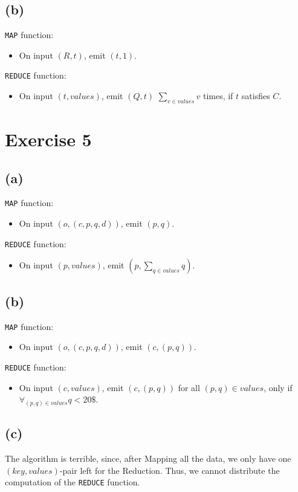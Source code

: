\documentclass[12pt]{article}
\begin{document}
\subsection*{(b)}
\verb|MAP| function:
\begin{itemize}
	\item	On input $(R, t)$, emit $(t,1)$.
\end{itemize}
\verb|REDUCE| function:
\begin{itemize}
	\item	On input $(t, values)$, emit $(Q,t)$ $\sum_{v \in values} v$ times, if $t$ satisfies $C$.
\end{itemize}

\section*{Exercise 5}
\subsection*{(a)}
\verb|MAP| function:
\begin{itemize}
	\item	On input $(o, (c,p,q,d))$, emit $(p,q)$.
\end{itemize}
\verb|REDUCE| function:
\begin{itemize}
	\item	On input $(p, values)$, emit $(p,\sum_{q \in values} q)$.
\end{itemize}

\subsection*{(b)}
\verb|MAP| function:
\begin{itemize}
	\item	On input $(o, (c,p,q,d))$, emit $(c,(p,q))$.
\end{itemize}
\verb|REDUCE| function:
\begin{itemize}
	\item	On input $(c, values)$, emit $(c,(p,q))$ for all $(p,q) \in values$, only if $\forall_{(p,q) \in values} q < 20\$$.
\end{itemize}

\subsection*{(c)}
The algorithm is terrible, since, after Mapping all the data, we only have one $(key, values)$-pair left for the Reduction. Thus, we cannot distribute the computation of the \verb|REDUCE| function.
\end{document}
